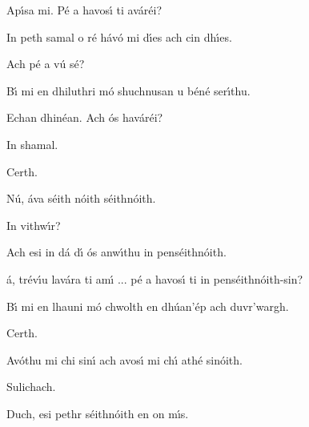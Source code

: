 \begin{leftbubbles}Ap\'{\i}sa mi. P\'{e} a havos\'{\i} ti av\'{a}r\'{e}i?\end{leftbubbles}
\begin{rightbubbles}In peth samal o r\'{e} h\'{a}v\'{o} mi d\'{\i}es ach cin dh\'{\i}es.\end{rightbubbles}
\begin{leftbubbles}Ach p\'{e} a v\'{u} s\'{e}?\end{leftbubbles}
\begin{rightbubbles}B\'{\i} mi en dhiluthri m\'{o} shuchnusan u b\'{e}n\'{e} ser\'{\i}thu.\end{rightbubbles}
\begin{leftbubbles}Echan dhin\'{e}an. Ach \'{o}s hav\'{a}r\'{e}i?\end{leftbubbles}
\begin{rightbubbles}In shamal.\end{rightbubbles}
\begin{leftbubbles}Certh.\end{leftbubbles}
\begin{rightbubbles}N\'{u}, \'{a}va s\'{e}ith n\'{o}ith s\'{e}ithn\'{o}ith.\end{rightbubbles}
\begin{leftbubbles}In vithw\'{\i}r?\end{leftbubbles}
\begin{rightbubbles}Ach esi in d\'{a} d\'{\i} \'{o}s anw\'{\i}thu in pens\'{e}ithn\'{o}ith.\end{rightbubbles}
\begin{leftbubbles}\'{a}, tr\'{e}v\'{\i}u lav\'{a}ra ti am\'{\i} ... p\'{e} a havos\'{\i} ti in pens\'{e}ithn\'{o}ith-sin?\end{leftbubbles}
\begin{rightbubbles}B\'{\i} mi en lhauni m\'{o} chwolth en dh\'{u}an'\'{e}p ach duvr'wargh.\end{rightbubbles}
\begin{leftbubbles}Certh.\end{leftbubbles}
\begin{rightbubbles}Av\'{o}thu mi chi sin\'{\i} ach avos\'{\i} mi ch\'{\i} ath\'{e} sin\'{o}ith.\end{rightbubbles}
\begin{leftbubbles}Sulichach.\end{leftbubbles}
\begin{rightbubbles}Duch, esi pethr s\'{e}ithn\'{o}ith en on m\'{\i}s.\end{rightbubbles}
